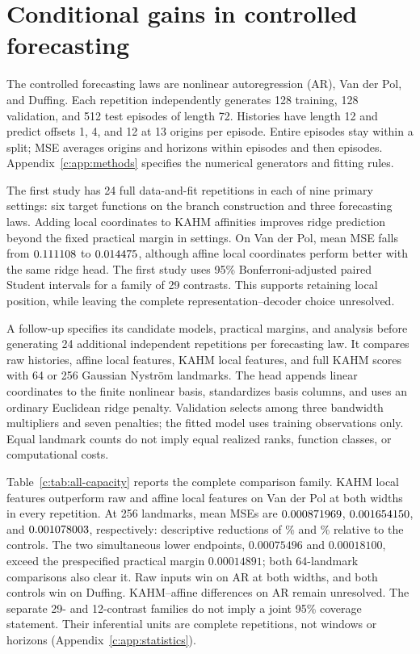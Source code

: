 \section{Conditional gains in controlled forecasting}\label{c:sec:capacity}

The controlled forecasting laws are nonlinear autoregression (AR),
Van der Pol, and Duffing. Each repetition independently generates 128
training, 128 validation, and 512 test episodes of length 72. Histories
have length 12 and predict offsets 1, 4, and 12 at 13 origins per episode.
Entire episodes stay within a split; MSE averages origins and horizons
within episodes and then episodes. Appendix~\ref{c:app:methods} specifies
the numerical generators and fitting rules.

The first study has 24 full data-and-fit repetitions in each of nine
primary settings: six target functions on the branch construction and three forecasting laws. Adding
local coordinates to KAHM affinities improves ridge prediction beyond the
fixed practical margin in \LocalPracticalBenefitCount{} settings. On Van
der Pol, mean MSE falls from $0.111108$ to
$0.014475$, although affine local coordinates perform better
with the same ridge head. The first study uses 95\% Bonferroni-adjusted paired Student intervals
for a family of 29 contrasts. This supports retaining local position,
while leaving the complete representation--decoder choice unresolved.

A follow-up specifies its candidate models, practical margins, and
analysis before generating 24 additional independent repetitions per
forecasting law. It compares raw histories, affine local features, KAHM local features,
and full KAHM scores with 64 or 256 Gaussian Nystr\"om landmarks. The
head appends linear coordinates to the finite nonlinear basis, standardizes
basis columns, and uses an ordinary Euclidean ridge penalty. Validation
selects among three bandwidth multipliers and seven penalties; the fitted
model uses training observations only. Equal landmark counts do not imply
equal realized ranks, function classes, or computational costs.

Table~\ref{c:tab:all-capacity} reports the complete comparison family. KAHM local features outperform raw and affine local features
on Van der Pol at both widths in every repetition. At 256 landmarks,
mean MSEs are $0.000871969$, $0.001654150$, and
$0.001078003$, respectively: descriptive reductions of
\VDPRawWideRelativeGain\% and \VDPAffineWideRelativeGain\% relative to the
controls. The two simultaneous lower endpoints, $0.00075496$ and
$0.00018100$, exceed the prespecified practical margin $0.00014891$; both
64-landmark comparisons also clear it. Raw inputs win on AR at both
widths, and both controls win on Duffing. KAHM--affine differences on AR
remain unresolved. The separate 29- and 12-contrast families do not imply
a joint 95\% coverage statement. Their inferential units are complete
repetitions, not windows or horizons (Appendix~\ref{c:app:statistics}).

